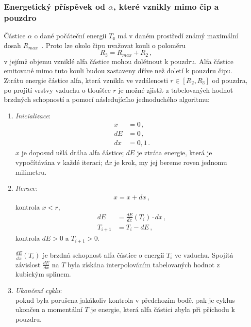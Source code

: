 \documentclass[11pt,a4paper]{article}
\begin{document}
\subsubsection{Energetický příspěvek od $\alpha$, které vznikly mimo čip a pouzdro}\label{navesti:algoritmus_nabiteCastice}
Částice $\alpha$ o dané počáteční energii $T_0$ má v daném prostředí známý maximální dosah $R_{max}$~\cite{astar}. Proto lze okolo čipu uvažovat kouli o poloměru 
$$R_3=R_{max}+R_2\,,$$
v jejímž objemu vzniklé alfa částice mohou dolétnout k pouzdru. Alfa částice emitované mimo tuto kouli budou zastaveny dříve než doletí k pouzdru čipu. Ztrátu energie částice alfa, která vznikla ve vzdálenosti $r\in[R_2, R_3]$ od pouzdra, po projití vrstvy vzduchu o tloušťce $r$ je možné zjistit z tabelovaných hodnot brzdných schopností \cite{astar} a pomocí následujícího jednoduchého algoritmu:
\begin{enumerate}
	\item \emph{Inicializace}:
	\begin{align*}
	x&=0\,,\\
	  dE&=0\,,\\
	   dx&=0,1\,.
	   \end{align*}
	  $x$ je doposud ušlá dráha alfa částice; $dE$ je ztráta energie, která je vypočítávána v každé iteraci; $dx$ je krok, my jej bereme roven jednomu milimetru.
	\item \emph{Iterace}:
	\begin{align}
		x = x+dx\,,
	\end{align}
	kontrola $x<r$,
	\begin{align*}
	dE &= \frac{dE}{dx}(T_i)\cdot dx\,,\\    
	T_{i+1} &= T_i - dE\,,
	\end{align*}  
	kontrola $dE>0$ a $T_{i+1}>0$. 

$\frac{dE}{dx}(T_i)$ je brzdná schopnost alfa částice o energii $T_i$ ve vzduchu. Spojitá závislost $\frac{dE}{dx}$ na $T$ byla získána interpolováním tabelovaných hodnot z~\cite{astar} kubickým splinem.
\item \emph{Ukončení cyklu}:\\
pokud byla porušena jakákoliv kontrola v předchozím bodě, pak je cyklus ukončen a momentální $T$ je energie, která alfa částici zbyla při příchodu k pouzdru.
\end{enumerate}
\end{document}

